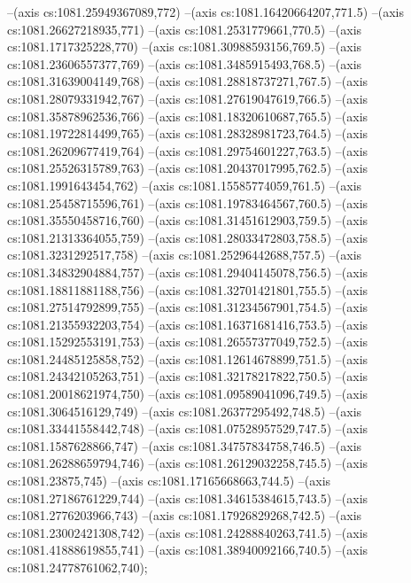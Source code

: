 --(axis cs:1081.25949367089,772)
--(axis cs:1081.16420664207,771.5)
--(axis cs:1081.26627218935,771)
--(axis cs:1081.2531779661,770.5)
--(axis cs:1081.1717325228,770)
--(axis cs:1081.30988593156,769.5)
--(axis cs:1081.23606557377,769)
--(axis cs:1081.3485915493,768.5)
--(axis cs:1081.31639004149,768)
--(axis cs:1081.28818737271,767.5)
--(axis cs:1081.28079331942,767)
--(axis cs:1081.27619047619,766.5)
--(axis cs:1081.35878962536,766)
--(axis cs:1081.18320610687,765.5)
--(axis cs:1081.19722814499,765)
--(axis cs:1081.28328981723,764.5)
--(axis cs:1081.26209677419,764)
--(axis cs:1081.29754601227,763.5)
--(axis cs:1081.25526315789,763)
--(axis cs:1081.20437017995,762.5)
--(axis cs:1081.1991643454,762)
--(axis cs:1081.15585774059,761.5)
--(axis cs:1081.25458715596,761)
--(axis cs:1081.19783464567,760.5)
--(axis cs:1081.35550458716,760)
--(axis cs:1081.31451612903,759.5)
--(axis cs:1081.21313364055,759)
--(axis cs:1081.28033472803,758.5)
--(axis cs:1081.3231292517,758)
--(axis cs:1081.25296442688,757.5)
--(axis cs:1081.34832904884,757)
--(axis cs:1081.29404145078,756.5)
--(axis cs:1081.18811881188,756)
--(axis cs:1081.32701421801,755.5)
--(axis cs:1081.27514792899,755)
--(axis cs:1081.31234567901,754.5)
--(axis cs:1081.21355932203,754)
--(axis cs:1081.16371681416,753.5)
--(axis cs:1081.15292553191,753)
--(axis cs:1081.26557377049,752.5)
--(axis cs:1081.24485125858,752)
--(axis cs:1081.12614678899,751.5)
--(axis cs:1081.24342105263,751)
--(axis cs:1081.32178217822,750.5)
--(axis cs:1081.20018621974,750)
--(axis cs:1081.09589041096,749.5)
--(axis cs:1081.3064516129,749)
--(axis cs:1081.26377295492,748.5)
--(axis cs:1081.33441558442,748)
--(axis cs:1081.07528957529,747.5)
--(axis cs:1081.1587628866,747)
--(axis cs:1081.34757834758,746.5)
--(axis cs:1081.26288659794,746)
--(axis cs:1081.26129032258,745.5)
--(axis cs:1081.23875,745)
--(axis cs:1081.17165668663,744.5)
--(axis cs:1081.27186761229,744)
--(axis cs:1081.34615384615,743.5)
--(axis cs:1081.2776203966,743)
--(axis cs:1081.17926829268,742.5)
--(axis cs:1081.23002421308,742)
--(axis cs:1081.24288840263,741.5)
--(axis cs:1081.41888619855,741)
--(axis cs:1081.38940092166,740.5)
--(axis cs:1081.24778761062,740);

